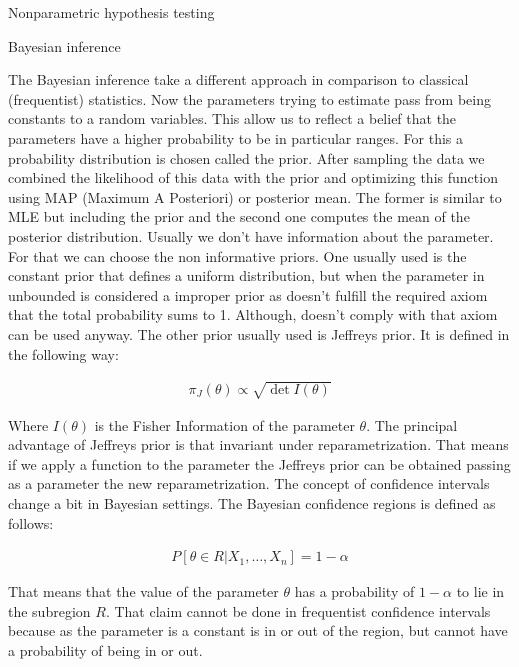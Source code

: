 \documentclass{beamer}
\begin{document}
\begin{columns}
\begin{column}{0.3\textwidth}
\begin{block}{Nonparametric hypothesis testing}
\end{block} 

\begin{block}{Bayesian inference}

The Bayesian inference take a different approach in comparison to classical (frequentist) statistics. Now the parameters trying to estimate pass from being constants to a random variables. This allow us to reflect a belief that the parameters have a higher probability to be in particular ranges. For this a probability distribution is chosen called the prior. After sampling the data we combined the likelihood of this data with the prior and optimizing this function using MAP (Maximum A Posteriori) or posterior mean. The former is similar to MLE but including the prior and the second one computes the mean of the posterior distribution.
\newline \newline
Usually we don't have information about the parameter. For that we can choose the non informative priors. One usually used is the constant prior that defines a uniform distribution, but when the parameter in unbounded is considered a improper prior as doesn't fulfill the required axiom that the total probability sums to 1. Although, doesn't comply with that axiom can be used anyway. The other prior usually used is Jeffreys prior. It is defined in the following way:

\begin{align*}
    \pi_J(\theta) \propto \sqrt{\det I(\theta)}
\end{align*}

Where $I(\theta)$ is the Fisher Information of the parameter $\theta$. The principal advantage of Jeffreys prior is that invariant under reparametrization. That means if we apply a function to the parameter the Jeffreys prior can be obtained passing as a parameter the new reparametrization.
\newline \newline
The concept of confidence intervals change a bit in Bayesian settings. The Bayesian confidence regions is defined as follows:

\begin{align*}
    P[\theta \in R| X_1,\ldots, X_n] = 1 - \alpha
\end{align*}

That means that the value of the parameter $\theta$ has a probability of $1 - \alpha$ to lie in the subregion $R$. That claim cannot be done in frequentist confidence intervals because as the parameter is a constant is in or out of the region, but cannot have a probability of being in or out.


\end{block}
\end{column}
\end{columns}
\end{document}
